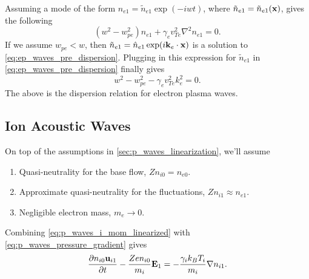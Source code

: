 \documentclass[a4paper,11pt]{report}
\begin{document}
Assuming a mode of the form $n_{e1} = \tilde{n}_{e1} \exp (-i w t)$, where $\tilde{n}_{e1} = \tilde{n}_{e1}(\mathbf{x})$, gives the following
\begin{equation}
    \label{eq:ep_waves_pre_dispersion}
    \left ( w^2 - w_{pe}^2 \right ) n_{e1} + \gamma_e v_{Te}^2 \nabla^2 n_{e1} = 0.
\end{equation}
If we assume $w_{pe} < w$, then $\tilde{n}_{e1} = \hat{n}_{e1} \exp ( i \mathbf{k}_e \cdot \mathbf{x} )$ is a solution to \cref{eq:ep_waves_pre_dispersion}. Plugging in this expression for $\tilde{n}_{e1}$ in \cref{eq:ep_waves_pre_dispersion} finally gives
\begin{equation}
    \label{eq:ep_waves_dispersion}
    w^2 - w_{pe}^2 - \gamma_e v_{Te}^2 k_e^2 = 0.
\end{equation}
The above is the dispersion relation for electron plasma waves.

\subsection{Ion Acoustic Waves}
\label{sec:io_waves}
On top of the assumptions in \cref{sec:p_waves_linearization}, we'll assume 
\begin{enumerate}
    \item Quasi-neutrality for the base flow, $Zn_{i0} = n_{e0}$.
    \item Approximate quasi-neutrality for the fluctuations, $Z n_{i1} \approx n_{e1}$.
    \item Negligible electron mass, $m_e \to 0$.
\end{enumerate}

Combining \cref{eq:p_waves_i_mom_linearized} with \cref{eq:p_waves_pressure_gradient} gives
\begin{equation}
    \label{eq:ia_waves_mom_linearized}
    \frac{\partial n_{i0} \mathbf{u}_{i1}}{\partial t} - \frac{Z e n_{i0}}{m_i} \mathbf{E}_1 = - \frac{\gamma_i k_B T_i}{m_i} \nabla n_{i1}.
\end{equation}
\end{document}

